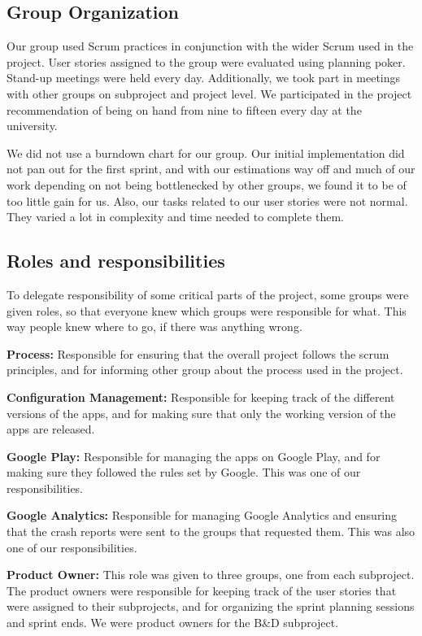 \subsection{Group Organization}
Our group used Scrum practices in conjunction with the wider Scrum used in the project. User stories assigned to the group were evaluated using planning poker. Stand-up meetings were held every day. Additionally, we took part in meetings with other groups on subproject and project level. We participated in the project recommendation of being on hand from nine to fifteen every day at the university.

We did not use a burndown chart for our group. Our initial implementation did not pan out for the first sprint, and with our estimations way off and much of our work depending on not being bottlenecked by other groups, we found it to be of too little gain for us. Also, our tasks related to our user stories were not normal. They varied a lot in complexity and time needed to complete them.

\subsection{Roles and responsibilities}
To delegate responsibility of some critical parts of the project, some groups were given roles, so that everyone knew which groups were responsible for what. This way people knew where to go, if there was anything wrong.

\textbf{Process:}
Responsible for ensuring that the overall project follows the scrum principles, and for informing other group about the process used in the project.

\textbf{Configuration Management:}
Responsible for keeping track of the different versions of the apps, and for making sure that only the working version of the apps are released.

\textbf{Google Play:}
Responsible for managing the apps on Google Play, and for making sure they followed the rules set by Google. This was one of our responsibilities.

\textbf{Google Analytics:}
Responsible for managing Google Analytics and ensuring that the crash reports were sent to the groups that requested them. This was also one of our responsibilities.

\textbf{Product Owner:}
This role was given to three groups, one from each subproject. The product owners were responsible for keeping track of the user stories that were assigned to their subprojects, and for organizing the sprint planning sessions and sprint ends. We were product owners for the B\&D subproject.

